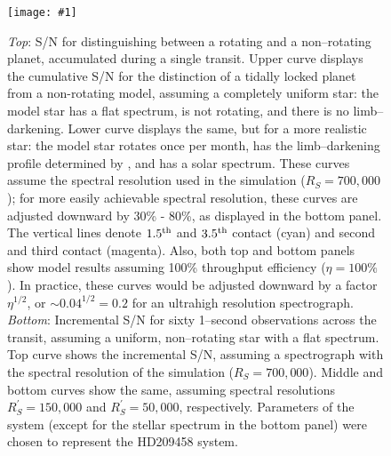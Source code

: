 \documentclass[12pt,preprint]{aastex}
\def\plotone#1{\centering \leavevmode
\texttt{[image: \#1]}}
\begin{document}
\begin{figure}[h!]
\plotone
{fig4.eps}
\caption{{\it Top}: S/N for distinguishing between a rotating and a
non--rotating planet, accumulated during a single transit.  Upper curve
displays the cumulative S/N for the distinction of a tidally locked planet
from a non-rotating model, assuming a completely uniform star: the model star
has a flat spectrum, is not rotating, and there is no limb--darkening.
Lower curve displays the same, but for a more realistic star: the model
star rotates once per month, has the limb--darkening profile determined by
\citet{knutson_et_al2007a}, and has a solar spectrum.
These curves assume the spectral resolution used in the simulation
($R_S = 700,000$); for more easily achievable spectral resolution, these
curves are adjusted downward by 30\% - 80\%, as displayed in the bottom panel.
The vertical lines denote $1.5^{\rm th}$ and $3.5^{\rm th}$ contact (cyan)
and second and third contact (magenta).
Also, both top and bottom panels show model results assuming 100\% throughput
efficiency ($\eta = 100\%$).  In practice, these curves would
be adjusted downward by a factor $\eta^{1/2}$, or $\sim 0.04^{1/2} = 0.2$ for
an ultrahigh resolution spectrograph.
{\it Bottom}: Incremental S/N for sixty 1--second observations across the
transit, assuming a uniform, non--rotating star with a flat spectrum.  Top
curve shows the incremental S/N, assuming a spectrograph with the spectral
resolution of the simulation ($R_S = 700,000$).  Middle and bottom curves
show the same, assuming spectral resolutions $R^\prime_S = 150,000$ and
$R^\prime_S = 50,000$, respectively.  Parameters of the system (except for
the stellar spectrum in the bottom panel) were chosen to represent the
HD209458 system.}
\label{fig:inc. and cum.}
\end{figure}
\end{document}
